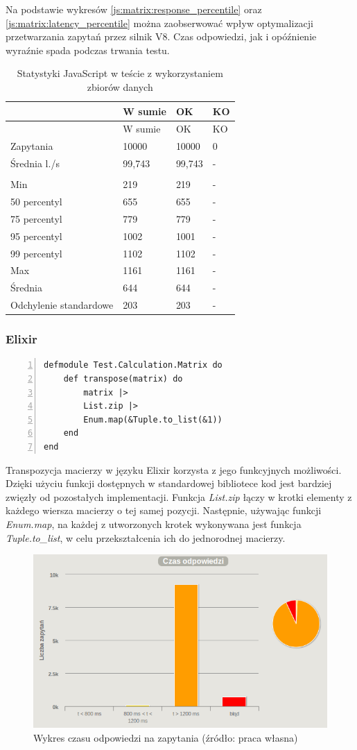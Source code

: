 \documentclass[12pt,twoside]{article}
\begin{document}
Na podstawie wykresów \ref{js:matrix:response_percentile} oraz
\ref{js:matrix:latency_percentile} można zaobserwować wpływ
optymalizacji przetwarzania zapytań przez silnik V8. Czas odpowiedzi,
jak i opóźnienie wyraźnie spada podczas trwania testu.

\begin{longtable}[c]{@{}llll@{}}
\caption{Statystyki JavaScript w teście z wykorzystaniem zbiorów
danych}\tabularnewline
\toprule
& W sumie & OK & KO\tabularnewline
\midrule
\endfirsthead
\toprule
& W sumie & OK & KO\tabularnewline
\midrule
\endhead
Zapytania & 10000 & 10000 & 0\tabularnewline
Średnia l./s & 99,743 & 99,743 & -\tabularnewline
& & &\tabularnewline
Min & 219 & 219 & -\tabularnewline
50 percentyl & 655 & 655 & -\tabularnewline
75 percentyl & 779 & 779 & -\tabularnewline
95 percentyl & 1002 & 1001 & -\tabularnewline
99 percentyl & 1102 & 1102 & -\tabularnewline
Max & 1161 & 1161 & -\tabularnewline
Średnia & 644 & 644 & -\tabularnewline
Odchylenie standardowe & 203 & 203 & -\tabularnewline
\bottomrule
\end{longtable}

\clearpage

\subsubsection{Elixir}\label{elixir-2}

\begin{lstlisting}[numbers=left, caption=Elixir - transpozycja macierzy]
defmodule Test.Calculation.Matrix do
    def transpose(matrix) do
        matrix |>
        List.zip |>
        Enum.map(&Tuple.to_list(&1))
    end
end
\end{lstlisting}

Transpozycja macierzy w języku Elixir korzysta z jego funkcyjnych
możliwości. Dzięki użyciu funkcji dostępnych w standardowej bibliotece
kod jest bardziej zwięzły od pozostałych implementacji. Funkcja
\emph{List.zip} łączy w krotki elementy z każdego wiersza macierzy o tej
samej pozycji. Następnie, używając funkcji \emph{Enum.map}, na każdej z
utworzonych krotek wykonywana jest funkcja \emph{Tuple.to\_list}, w celu
przekształcenia ich do jednorodnej macierzy.

\begin{figure}[htbp]
\centering
\includegraphics[resolution=150]{test_results/elixir/matrix/screenshots/response_times.png}
\caption{Wykres czasu odpowiedzi na zapytania (źródło: praca własna)}
\end{figure}
\end{document}
